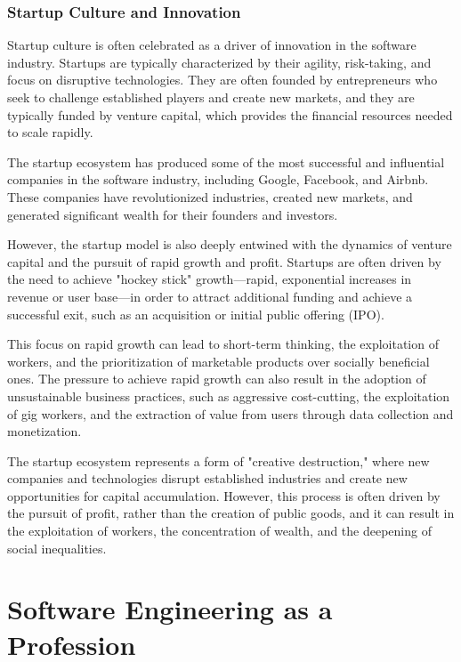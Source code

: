 \begin{refsection}
\begin{multicols}{2}
{\subsubsection{Startup Culture and Innovation}

Startup culture is often celebrated as a driver of innovation in the software industry. Startups are typically characterized by their agility, risk-taking, and focus on disruptive technologies. They are often founded by entrepreneurs who seek to challenge established players and create new markets, and they are typically funded by venture capital, which provides the financial resources needed to scale rapidly.

The startup ecosystem has produced some of the most successful and influential companies in the software industry, including Google, Facebook, and Airbnb. These companies have revolutionized industries, created new markets, and generated significant wealth for their founders and investors.

However, the startup model is also deeply entwined with the dynamics of venture capital and the pursuit of rapid growth and profit. Startups are often driven by the need to achieve "hockey stick" growth—rapid, exponential increases in revenue or user base—in order to attract additional funding and achieve a successful exit, such as an acquisition or initial public offering (IPO).

This focus on rapid growth can lead to short-term thinking, the exploitation of workers, and the prioritization of marketable products over socially beneficial ones. The pressure to achieve rapid growth can also result in the adoption of unsustainable business practices, such as aggressive cost-cutting, the exploitation of gig workers, and the extraction of value from users through data collection and monetization.

The startup ecosystem represents a form of "creative destruction," where new companies and technologies disrupt established industries and create new opportunities for capital accumulation. However, this process is often driven by the pursuit of profit, rather than the creation of public goods, and it can result in the exploitation of workers, the concentration of wealth, and the deepening of social inequalities.
}
\newpage
\end{multicols}
\section{Software Engineering as a Profession}
\begin{multicols}{2}
{\small
}
\end{multicols}
\end{refsection}
